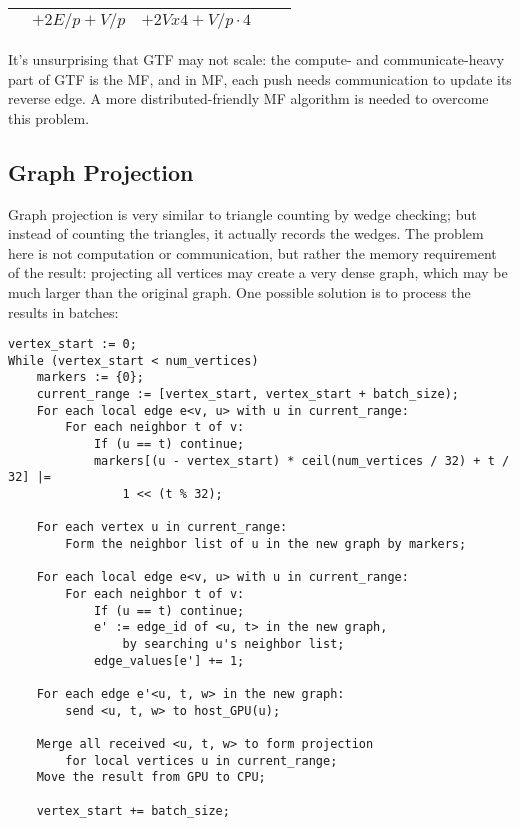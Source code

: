 \documentclass[10pt,oneside]{memoir}
\begin{document}
\begin{longtable}[]{@{}lllll@{}}
\begin{minipage}[t]{0.11\columnwidth}
\strut
\end{minipage} & \begin{minipage}[t]{0.18\columnwidth}\raggedright
\(+ 2E/p + V/p\)\strut
\end{minipage} & \begin{minipage}[t]{0.23\columnwidth}\raggedright
\(+ 2V x 4 + V/p \cdot 4\)\strut
\end{minipage} & \begin{minipage}[t]{0.14\columnwidth}\raggedright
\strut
\end{minipage} & \begin{minipage}[t]{0.20\columnwidth}\raggedright
\strut
\end{minipage}\tabularnewline
\bottomrule
\end{longtable}

It's unsurprising that GTF may not scale: the compute- and
communicate-heavy part of GTF is the MF, and in MF, each push needs
communication to update its reverse edge. A more distributed-friendly MF
algorithm is needed to overcome this problem.

\hypertarget{graph-projection}{%
\subsection{Graph Projection}\label{graph-projection}}

Graph projection is very similar to triangle counting by wedge checking;
but instead of counting the triangles, it actually records the wedges.
The problem here is not computation or communication, but rather the
memory requirement of the result: projecting all vertices may create a
very dense graph, which may be much larger than the original graph. One
possible solution is to process the results in batches:

\begin{verbatim}
vertex_start := 0;
While (vertex_start < num_vertices)
    markers := {0};
    current_range := [vertex_start, vertex_start + batch_size);
    For each local edge e<v, u> with u in current_range:
        For each neighbor t of v:
            If (u == t) continue;
            markers[(u - vertex_start) * ceil(num_vertices / 32) + t / 32] |=
                1 << (t % 32);

    For each vertex u in current_range:
        Form the neighbor list of u in the new graph by markers;

    For each local edge e<v, u> with u in current_range:
        For each neighbor t of v:
            If (u == t) continue;
            e' := edge_id of <u, t> in the new graph,
                by searching u's neighbor list;
            edge_values[e'] += 1;

    For each edge e'<u, t, w> in the new graph:
        send <u, t, w> to host_GPU(u);

    Merge all received <u, t, w> to form projection
        for local vertices u in current_range;
    Move the result from GPU to CPU;

    vertex_start += batch_size;
\end{verbatim}
\end{document}

